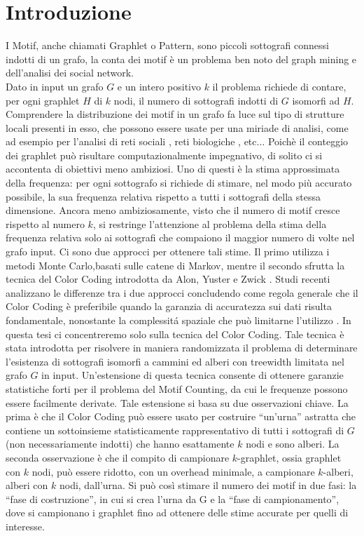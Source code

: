 \chapter{Introduzione}

I Motif, anche chiamati Graphlet o Pattern, sono piccoli sottografi connessi indotti di un grafo, la conta dei motif \`e un problema ben noto del graph mining e dell'analisi dei social network.\\
Dato in input un grafo $G$ e un intero positivo $k$ il problema richiede di contare,  per ogni graphlet $H$ di $k$ nodi, il numero di sottografi indotti di $G$ isomorfi ad $H$.
Comprendere la distribuzione dei motif in un grafo fa luce sul tipo di strutture locali presenti in esso, che possono essere usate per una miriade di analisi, come ad esempio per l'analisi di reti sociali \cite{bhuiyan2012guise,zhao2010subgraph,boldi2011layered}, reti biologiche \cite{alon2008biomolecular}, etc$ \dots $
Poich\`e il conteggio dei graphlet pu\`o risultare computazionalmente impegnativo, di solito ci si accontenta di obiettivi meno ambiziosi.
Uno di questi \`e la stima approssimata della frequenza: per ogni sottografo si richiede di stimare, nel modo pi\`u accurato possibile, la sua frequenza relativa rispetto a tutti i sottografi della stessa dimensione.
Ancora meno ambiziosamente, visto che il numero di motif  cresce rispetto al numero $ k $, si restringe l'attenzione al problema della stima della frequenza relativa solo ai sottografi che compaiono il maggior numero di volte nel grafo input.
Ci sono due approcci per ottenere tali stime.
Il primo utilizza i metodi Monte Carlo,basati sulle catene di Markov, mentre il secondo sfrutta la tecnica del Color Coding introdotta da Alon, Yuster e Zwick \cite{alon1995color}.
Studi recenti analizzano le differenze tra i due approcci  concludendo come regola generale che il Color Coding \`e preferibile quando  la garanzia di accuratezza sui dati risulta fondamentale,  nonostante la complessit\'a spaziale che pu\`o limitarne l'utilizzo \cite{bressan2018motif}.
In questa tesi ci concentreremo solo sulla tecnica del Color Coding.
Tale tecnica \`e stata introdotta per risolvere in maniera randomizzata il problema di determinare l'esistenza di sottografi isomorfi a cammini ed alberi con treewidth limitata nel grafo $ G $ in input.
Un'estensione di questa tecnica consente di ottenere garanzie statistiche forti per il problema del Motif Counting, da cui le frequenze possono essere facilmente derivate.
Tale estensione si basa su due osservazioni chiave.
La prima \`e che il Color Coding pu\`o essere usato per costruire ``un'urna'' astratta che contiene un sottoinsieme statisticamente rappresentativo di tutti i sottografi di $G$ (non necessariamente indotti) che hanno esattamente $ k $ nodi e sono alberi.
La seconda osservazione \`e che il compito di campionare $ k $-graphlet, ossia graphlet con $ k $ nodi, pu\`o essere ridotto, con un overhead minimale, a campionare $ k $-alberi, alberi con $ k $ nodi, dall'urna.
Si pu\`o cos\`i stimare il numero dei motif in due fasi: la ``fase di costruzione'', in cui si crea l'urna da G e la ``fase di campionamento'', dove si campionano i graphlet fino ad ottenere delle stime accurate per quelli di interesse.



